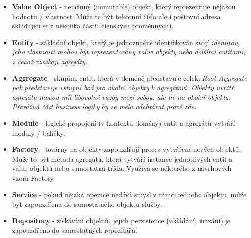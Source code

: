 \begin{itemize}
	\item \textbf{Value Object} - neměnný (immutable) objekt, který reprezentuje nějakou hodnotu / vlastnost. Může to být telefonní číslo ale i poštovní adresa skládající se z několika částí (členských proměnných).
	\item \textbf{Entity} - základní objekt, který je jednoznačně identifikován svojí \it{identitou}, jeho vlastnosti mohou být reprezentovány value objekty nebo dalšími entitami, z čehož vznikají agregáty.

	\item \textbf{Aggregate} - skupina entit, která v doméně představuje celek. \it{Root Aggregate} pak představuje vstupní bod pro okolní objekty k agregátovi. Objekty uvnitř agregátu mohou mít libovolné vazby mezi sebou, ale ne na okolní objekty. Převážná část business logiky by se měla odehrávat právě zde.
	\item \textbf{Module} - logické propojení (v kontextu domény) entit a agregátů vytváří moduly / balíčky.
	\item \textbf{Factory} - továrny na objekty zapouzdřují proces vytváření nových objektů. Může to být metoda agregátu, která vytváří instance jednotlivých entit a value objektů nebo samostatná třída. Využívá se některého z návrhových vzorů Factory \cite{Vrana2013}\cite{Boehmer2015}
	\item \textbf{Service} - pokud nějaká operace nedává smysl v rámci jednoho objektu, může být zapouzdřena do samostatného objektu služby.
	\item \textbf{Repository} - získávání objektů, jejich perzistence (ukládání, mazání) je zapouzdřeno do samostatných repozitářů. 
\end{itemize}